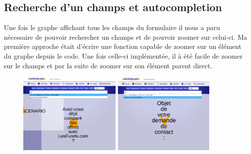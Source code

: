 \subsection{Recherche d’un champs et autocompletion}
Une fois le graphe affichant tous les champs du formulaire il nous a paru nécessaire de pouvoir rechercher un champs et de pouvoir zoomer sur celui-ci. Ma première approche était d'écrire une fonction capable de zoomer sur un élément du graphe depuis le code. Une fois celle-ci implémentée, il à été facile de zoomer sur le champs et par la suite de zoomer sur son élément parent direct.
\vspace{0.5in}
\begin{figure}[!h]
\centering
\includegraphics[height=4cm]{outil/feature-search.png}
\includegraphics[height=4cm]{outil/feature-search-2.png}
\end{figure}
